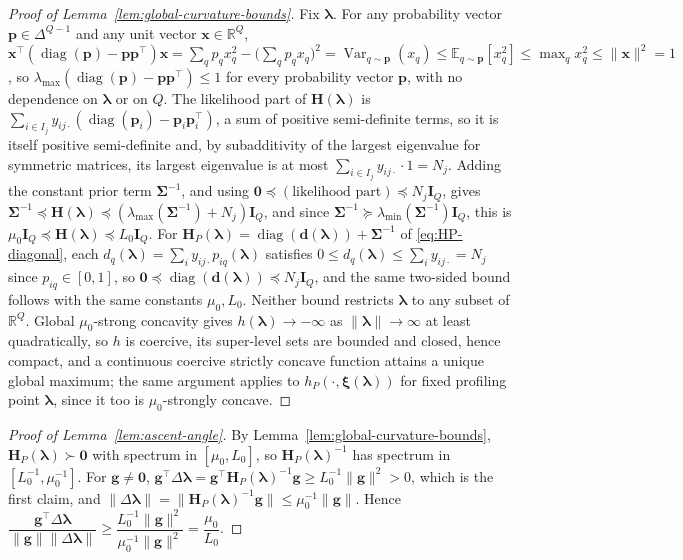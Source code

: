 \begin{proof}[Proof of Lemma~\ref{lem:global-curvature-bounds}]
Fix $\bm{\lambda}$. For any probability vector $\bm{p}\in\Delta^{Q-1}$ and any unit vector $\mathbf{x}\in\mathbb{R}^{Q}$, $\mathbf{x}^{\top}(\operatorname{diag}(\bm{p})-\bm{p}\bm{p}^{\top})\mathbf{x}=\sum_{q}p_{q}x_{q}^{2}-\big(\sum_{q}p_{q}x_{q}\big)^{2}=\operatorname{Var}_{q\sim\bm{p}}(x_{q})\leq\mathbb{E}_{q\sim\bm{p}}[x_{q}^{2}]\leq\max_{q}x_{q}^{2}\leq\|\mathbf{x}\|^{2}=1$, so $\lambda_{\max}(\operatorname{diag}(\bm{p})-\bm{p}\bm{p}^{\top})\leq1$ for every probability vector $\bm{p}$, with no dependence on $\bm{\lambda}$ or on $Q$. The likelihood part of $\mathbf{H}(\bm{\lambda})$ is $\sum_{i\in I_{j}}y_{ij\cdot}(\operatorname{diag}(\bm{p}_{i})-\bm{p}_{i}\bm{p}_{i}^{\top})$, a sum of positive semi-definite terms, so it is itself positive semi-definite and, by subadditivity of the largest eigenvalue for symmetric matrices, its largest eigenvalue is at most $\sum_{i\in I_{j}}y_{ij\cdot}\cdot1=N_{j}$. Adding the constant prior term $\bm{\Sigma}^{-1}$, and using $\bm{0}\preceq(\text{likelihood part})\preceq N_{j}\mathbf{I}_{Q}$, gives $\bm{\Sigma}^{-1}\preceq\mathbf{H}(\bm{\lambda})\preceq(\lambda_{\max}(\bm{\Sigma}^{-1})+N_{j})\mathbf{I}_{Q}$, and since $\bm{\Sigma}^{-1}\succeq\lambda_{\min}(\bm{\Sigma}^{-1})\mathbf{I}_{Q}$, this is $\mu_{0}\mathbf{I}_{Q}\preceq\mathbf{H}(\bm{\lambda})\preceq L_{0}\mathbf{I}_{Q}$. For $\mathbf{H}_{P}(\bm{\lambda})=\operatorname{diag}(\mathbf{d}(\bm{\lambda}))+\bm{\Sigma}^{-1}$ of \eqref{eq:HP-diagonal}, each $d_{q}(\bm{\lambda})=\sum_{i}y_{ij\cdot}p_{iq}(\bm{\lambda})$ satisfies $0\leq d_{q}(\bm{\lambda})\leq\sum_{i}y_{ij\cdot}=N_{j}$ since $p_{iq}\in[0,1]$, so $\bm{0}\preceq\operatorname{diag}(\mathbf{d}(\bm{\lambda}))\preceq N_{j}\mathbf{I}_{Q}$, and the same two-sided bound follows with the same constants $\mu_{0},L_{0}$. Neither bound restricts $\bm{\lambda}$ to any subset of $\mathbb{R}^{Q}$. Global $\mu_{0}$-strong concavity gives $h(\bm{\lambda})\to-\infty$ as $\|\bm{\lambda}\|\to\infty$ at least quadratically, so $h$ is coercive, its super-level sets are bounded and closed, hence compact, and a continuous coercive strictly concave function attains a unique global maximum; the same argument applies to $h_{P}(\cdot,\bm{\xi}(\bm{\lambda}))$ for fixed profiling point $\bm{\lambda}$, since it too is $\mu_{0}$-strongly concave.
\end{proof}

\begin{proof}[Proof of Lemma~\ref{lem:ascent-angle}]
By Lemma~\ref{lem:global-curvature-bounds}, $\mathbf{H}_{P}(\bm{\lambda})\succ\bm{0}$ with spectrum in $[\mu_{0},L_{0}]$, so $\mathbf{H}_{P}(\bm{\lambda})^{-1}$ has spectrum in $[L_{0}^{-1},\mu_{0}^{-1}]$. For $\mathbf{g}\neq\bm{0}$, $\mathbf{g}^{\top}\Delta\bm{\lambda}=\mathbf{g}^{\top}\mathbf{H}_{P}(\bm{\lambda})^{-1}\mathbf{g}\geq L_{0}^{-1}\|\mathbf{g}\|^{2}>0$, which is the first claim, and $\|\Delta\bm{\lambda}\|=\|\mathbf{H}_{P}(\bm{\lambda})^{-1}\mathbf{g}\|\leq\mu_{0}^{-1}\|\mathbf{g}\|$. Hence $\dfrac{\mathbf{g}^{\top}\Delta\bm{\lambda}}{\|\mathbf{g}\|\|\Delta\bm{\lambda}\|}\geq\dfrac{L_{0}^{-1}\|\mathbf{g}\|^{2}}{\mu_{0}^{-1}\|\mathbf{g}\|^{2}}=\dfrac{\mu_{0}}{L_{0}}$.
\end{proof}

